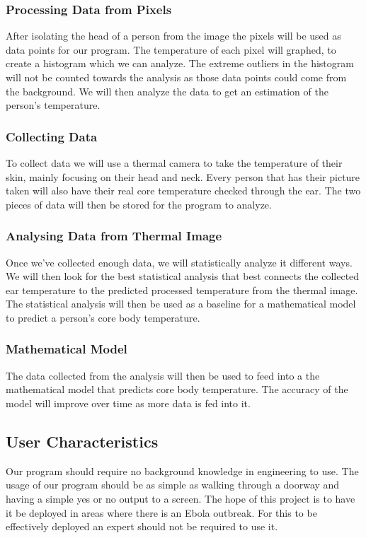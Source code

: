 	\subsubsection*{Processing Data from Pixels}
	After isolating the head of a person from the image the pixels will be used as data points for our program. The temperature of each pixel will graphed, to create a histogram which we can analyze. The extreme outliers in the histogram will not be counted towards the analysis as those data points could come from the background. We will then analyze the data to get an estimation of the person’s temperature.
	\subsubsection*{Collecting Data}
	To collect data we will use a thermal camera to take the temperature of their skin, mainly focusing on their head and neck. Every person that has their picture taken will also have their real core temperature checked through the ear. The two pieces of data will then be stored for the program to analyze.
	\subsubsection*{Analysing Data from Thermal Image}
	Once we’ve collected enough data, we will statistically analyze it different ways. We will then look for the best statistical analysis that best connects the collected ear temperature to the predicted processed temperature from the thermal image. The statistical analysis will then be used as a baseline for a mathematical model to predict a person’s core body temperature.
	\subsubsection*{Mathematical Model}
	The data collected from the analysis will then be used to feed into a the mathematical model that predicts core body temperature. The accuracy of the model will improve over time as more data is fed into it.
\subsection*{User Characteristics}
	Our program should require no background knowledge in engineering to use. The usage of our program should be as simple as walking through a doorway and having a simple yes or no output to a screen. The hope of this project is to have it be deployed in areas where there is an Ebola outbreak. For this to be effectively deployed an expert should not be required to use it.
